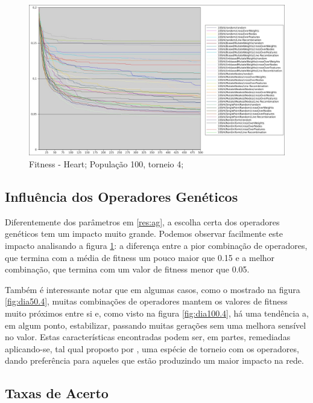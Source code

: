 \documentclass[12pt]{article}
\begin{document}
\begin{figure}[htp]
\center
\includegraphics[scale=0.4, keepaspectratio]{hea_100_4.jpg} 
\caption{Fitness - Heart; População 100, torneio 4;}
\label{fig:hea100.4}
\end{figure}



\subsection{Influência dos Operadores Genéticos}

Diferentemente dos parâmetros em \ref{res:ag}, a escolha certa dos operadores genéticos tem um impacto muito grande. Podemos observar facilmente este impacto analisando a figura \ref{fig:hea100.4}: a diferença entre a pior combinação de operadores, que termina com a média de fitness um pouco maior que 0.15 e a melhor combinação, que termina com um valor de fitness menor que 0.05.

Também é interessante notar que em algumas casos, como o mostrado na figura \ref{fig:dia50.4}, muitas combinações de operadores mantem os valores de fitness muito próximos entre si e, como visto na figura \ref{fig:dia100.4}, há uma tendência a, em algum ponto, estabilizar, passando muitas gerações sem uma melhora sensível no valor. Estas características encontradas podem ser, em partes, remediadas aplicando-se, tal qual proposto por \cite{montana}, uma espécie de torneio com os operadores, dando preferência para aqueles que estão produzindo um maior impacto na rede.

\subsection{Taxas de Acerto}
\end{document}

